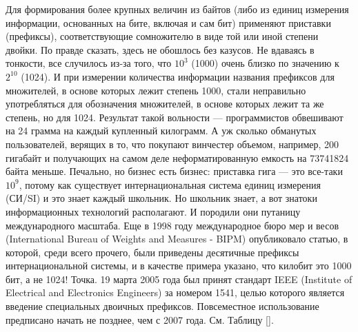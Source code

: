 Для формирования более крупных величин из байтов (либо из единиц измерения информации, основанных на бите, включая и сам бит) применяют приставки (префиксы), соответствующие сомножителю в виде той или иной степени двойки. По правде сказать, здесь не обошлось без казусов. Не вдаваясь в тонкости, все случилось из-за того, что $10^3$ (1000) очень близко по значению к $2^10$ (1024). И при измерении количества информации названия префиксов для множителей, в основе которых лежит степень 1000, стали неправильно употребляться для обозначения множителей, в основе которых лежит та же степень, но для 1024. Результат такой вольности --- программистов обвешивают на 24 грамма на каждый купленный килограмм. А уж сколько обманутых пользователей, верящих в то, что покупают винчестер объемом, например, 200 гигабайт и получающих на самом деле неформатированную емкость на 73741824 байта меньше. Печально, но бизнес есть бизнес: приставка гига --- это все-таки $10^9$, потому как существует интернациональная система единиц измерения (СИ/SI) и это знает каждый школьник. Но школьник знает, а вот знатоки информационных технологий располагают. И породили они путаницу международного масштаба. Еще в 1998 году международное бюро мер и весов (International Bureau of Weights and Measures - BIPM) опубликовало статью, в которой, среди всего прочего, были приведены десятичные префиксы интернациональной системы, и в качестве примера указано, что килобит это 1000 бит, а не 1024! Точка. 19 марта 2005 года был принят стандарт IEEE (Institute of Electrical and Electronics Engineers) за номером 1541, целью которого является введение специальных двоичных префиксов. Повсеместное использование предписано начать не позднее, чем с 2007 года. См. Таблицу \ref{}.


